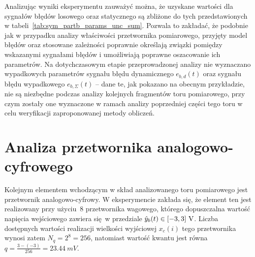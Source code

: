 Analizując wyniki eksperymentu zauważyć można, że uzyskane wartości dla sygnałów błędów losowego oraz statycznego są zbliżone do tych przedstawionych w tabeli~\ref{tab:sym_partb_params_unc_sum}. Pozwala to zakładać, że podobnie jak w przypadku analizy właściwości przetwornika pomiarowego, przyjęty model błędów oraz stosowane zależności poprawnie określają związki pomiędzy wskazanymi sygnałami błędów i umożliwiają poprawne oszacowanie ich parametrów. Na dotychczasowym etapie przeprowadzonej analizy nie wyznaczano wypadkowych parametrów sygnału błędu dynamicznego $e_{b,d}(t)$ oraz sygnału błędu wypadkowego $e_{b,\Sigma}(t)$ -- dane te, jak pokazano na obecnym przykładzie, nie są niezbędne podczas analizy kolejnych fragmentów toru pomiarowego, przy czym zostały one wyznaczone w ramach analizy poprzedniej części tego toru w celu weryfikacji zaproponowanej metody obliczeń.

\section{Analiza przetwornika analogowo-cyfrowego}

Kolejnym elementem wchodzącym w skład analizowanego toru pomiarowego jest przetwornik analogowo-cyfrowy. W eksperymencie zakłada się, że element ten jest realizowany przy użyciu~\qty{8}{\bitOwego} przetwornika wagowego, którego dopuszczalna wartość napięcia wejściowego zawiera się w przedziale $\hat{y}_{b}(t) \in \interval{-3}{3}~\unit{V}$. Liczba dostępnych wartości realizacji wielkości wyjściowej $x_{c}(i)$ tego przetwornika wynosi zatem $N_{q} = 2^{8} = 256$, natomiast wartość kwantu jest równa $q = \frac{3 - (-3)}{256} = \qty{23.44}{mV}$.

